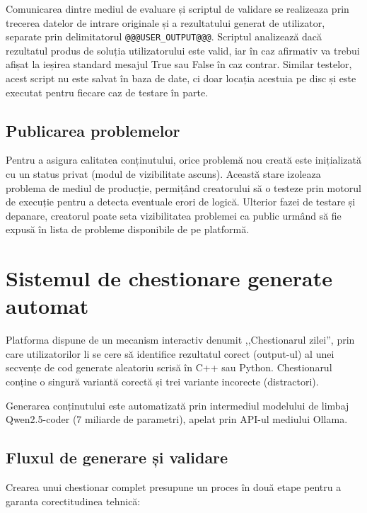 Comunicarea dintre mediul de evaluare și scriptul de validare se realizeaza prin trecerea datelor de intrare originale și a rezultatului generat de utilizator, separate prin delimitatorul \verb|@@@USER_OUTPUT@@@|. Scriptul analizează dacă rezultatul produs de soluția utilizatorului este valid, iar în caz afirmativ va trebui afișat la ieșirea standard mesajul True sau False în caz contrar. Similar testelor, acest script nu este salvat în baza de date, ci doar locația acestuia pe disc și este executat pentru fiecare caz de testare în parte. 

\subsection{Publicarea problemelor}

Pentru a asigura calitatea conținutului, orice problemă nou creată este inițializată cu un status privat (modul de vizibilitate ascuns). Această stare izoleaza problema de mediul de producție, permițând creatorului să o testeze prin motorul de execuție pentru a detecta eventuale erori de logică. Ulterior fazei de testare și depanare, creatorul poate seta vizibilitatea problemei ca public urmând să fie expusă în lista de probleme disponibile de pe platformă.

\section{Sistemul de chestionare generate automat}

Platforma dispune de un mecanism interactiv denumit ,,Chestionarul zilei”, prin care utilizatorilor li se cere să identifice rezultatul corect (output-ul) al unei secvențe de cod generate aleatoriu scrisă în C++ sau Python. Chestionarul conține o singură variantă corectă și trei variante incorecte (distractori). 

Generarea conținutului este automatizată prin intermediul modelului de limbaj Qwen2.5-coder (7 miliarde de parametri), apelat prin API-ul mediului Ollama.

\subsection{Fluxul de generare și validare}

Crearea unui chestionar complet presupune un proces în două etape pentru a garanta corectitudinea tehnică:

